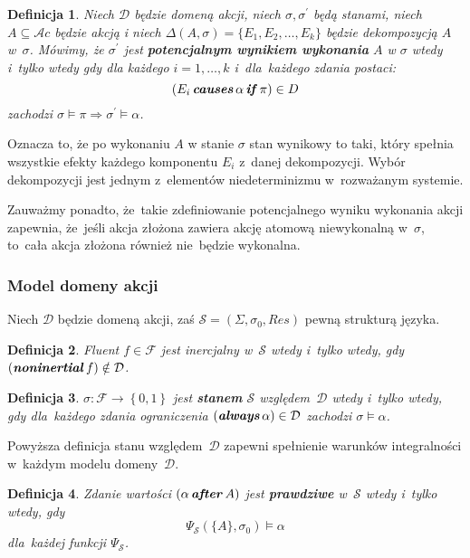 \documentclass[11pt,a4paper]{article}
\newtheorem{defn}{Definicja}
\DeclareMathOperator{\After}{\textbf{\textit{after}}}
\DeclareMathOperator{\Causes}{\textbf{\textit{causes}}}
\DeclareMathOperator{\If}{\textbf{\textit{if}}}
\DeclareMathOperator{\Always}{\textbf{\textit{always}}}
\DeclareMathOperator{\Noninertial}{\textbf{\textit{noninertial}}}
\begin{document}
\begin{defn}
    Niech $\mathcal{D}$ będzie domeną akcji, niech $\sigma, \sigma^\prime$ będą stanami, niech $A \subseteq \mathcal{A}c$ będzie akcją i niech $\Delta(A, \sigma) = \{ E_1, E_2, \dots, E_k \}$ będzie dekompozycją $A$ w~$\sigma$.
    Mówimy, że $\sigma^\prime$ jest \textbf{potencjalnym wynikiem wykonania} $A$ w $\sigma$ wtedy i~tylko wtedy gdy dla każdego $i = 1, \dots, k$ i~dla~każdego zdania postaci: 
    $$ (E_i \Causes \alpha \If \pi) \in D $$
    zachodzi $\sigma \models \pi \Rightarrow \sigma^\prime \models \alpha $.
\end{defn} 
    
Oznacza to, że po wykonaniu $A$ w stanie $\sigma$ stan wynikowy to taki, który spełnia wszystkie efekty każdego komponentu $E_i$ z~danej dekompozycji.
Wybór dekompozycji jest jednym z~elementów niedeterminizmu w~rozważanym systemie.

Zauważmy ponadto, że~takie zdefiniowanie potencjalnego wyniku wykonania akcji zapewnia, że~jeśli akcja złożona zawiera akcję atomową niewykonalną w~$\sigma$, to~cała akcja złożona również nie~będzie wykonalna.

\subsubsection{Model domeny akcji}

Niech $\mathcal{D}$ będzie domeną akcji, zaś $\mathcal{S} = \left(\Sigma, \sigma_0, Res\right)$ pewną strukturą języka.

\begin{defn}
    Fluent $f \in \mathcal{F}$ jest inercjalny w~$\mathcal{S}$ wtedy i~tylko wtedy, gdy $\left(\Noninertial f\right) \notin \mathcal{D}$.
\end{defn}

\begin{defn}
    $\sigma : \mathcal{F} \rightarrow \left\{0,1\right\}$ jest \textbf{stanem} $\mathcal{S}$ względem~$\mathcal{D}$ wtedy i~tylko wtedy, gdy dla~każdego zdania ograniczenia $\left(\Always \alpha\right) \in \mathcal{D}$ zachodzi $\sigma \models \alpha$.
\end{defn}

Powyższa definicja stanu względem~$\mathcal{D}$ zapewni spełnienie warunków integralności w~każdym modelu domeny~$\mathcal{D}$.

\begin{defn}
    Zdanie wartości $(\alpha \After A)$ jest \textbf{prawdziwe} w~$\mathcal{S}$ wtedy i~tylko wtedy, gdy
    $$\Psi_{\mathcal{S}}(\{ A \}, \sigma_0) \models \alpha$$
    dla~każdej funkcji $\Psi_{\mathcal{S}}$.
\end{defn}
\end{document}
